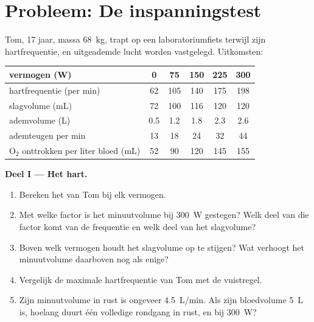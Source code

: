 \section{Probleem: De inspanningstest}

\begin{problem}
\label{pb:g10:heart-lungs-effort:1}
Tom, 17 jaar, massa \qty{68}{kg}, trapt op een laboratoriumfiets terwijl
zijn hartfrequentie,  en uitgeademde lucht worden vastgelegd.
Uitkomsten:

\begin{center}
\begin{tabular}{lccccc}
vermogen (W) & 0 & 75 & 150 & 225 & 300 \\ \hline
hartfrequentie (per min) & 62 & 105 & 140 & 175 & 198 \\
slagvolume (mL) & 72 & 100 & 116 & 120 & 120 \\
ademvolume (L) & 0.5 & 1.2 & 1.8 & 2.3 & 2.6 \\
ademteugen per min & 13 & 18 & 24 & 32 & 44 \\
$\mathrm{O_2}$ onttrokken per liter bloed (mL) & 52 & 90 & 120 & 145 & 155 \\
\end{tabular}
\end{center}

\medskip
\noindent\textbf{Deel I --- Het hart.}
\begin{enumerate}
  \item Bereken het  van Tom bij elk vermogen.
  \item Met welke factor is het minuutvolume bij \qty{300}{W} gestegen?
        Welk deel van die factor komt van de frequentie en welk deel van
        het slagvolume?
  \item Boven welk vermogen houdt het slagvolume op te stijgen? Wat
        verhoogt het minuutvolume daarboven nog als enige?
  \item Vergelijk de maximale hartfrequentie van Tom met de vuistregel.
  \item Zijn minuutvolume in rust is ongeveer \qty{4.5}{L/min}. Als zijn
        bloedvolume \qty{5}{L} is, hoelang duurt één volledige rondgang
        in rust, en bij \qty{300}{W}?
\end{enumerate}


\end{problem}
